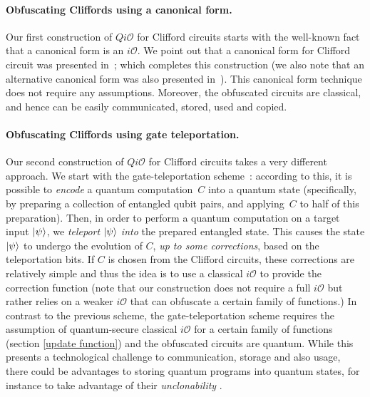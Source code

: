 \paragraph{Obfuscating Cliffords using a canonical form.} Our first construction of $Qi\mathcal{O}$ for Clifford circuits starts with the well-known fact that a canonical form is an $i\mathcal{O}$. We point out that a canonical form for Clifford circuit was presented in~\cite{AG04}; which completes this construction (we also note that an alternative canonical form was also presented in~\cite{Sel13arxiv}). This canonical form technique  does not require any assumptions. Moreover, the obfuscated circuits are classical, and hence can be easily communicated, stored, used and copied.

\paragraph{Obfuscating Cliffords using gate teleportation.} Our second construction of $Qi\mathcal{O}$ for Clifford circuits takes a very different approach. We start with the gate-teleportation scheme~\cite{GC99}: according to this, it is possible to \emph{encode} a quantum computation~$C$ into a quantum state (specifically, by preparing a collection of entangled qubit pairs, and applying~$C$ to half of this preparation). Then, in order to perform a quantum computation on a target input ${\lvert}\psi\rangle$, we \emph{teleport} ${\lvert}\psi\rangle$ \emph{into} the prepared entangled state. This causes the state ${\lvert}\psi\rangle$ to undergo the evolution of $C$, \emph{up to some corrections}, based on the teleportation bits. If $C$ is chosen from the Clifford circuits, these corrections are relatively simple and thus the idea is to use a classical  $i\mathcal{O}$ to provide the correction function (note that our construction does not require a full $i\mathcal{O}$ but rather relies on a weaker $i\mathcal{O}$ that can obfuscate a certain family of functions.)
In contrast to the previous scheme, the gate-teleportation scheme requires the assumption of quantum-secure classical $i\mathcal{O}$ for a certain family of functions (section \ref{update function}) and the obfuscated circuits are quantum. While this presents a technological challenge to communication, storage and also usage, there could be advantages to storing quantum programs into quantum states, for instance to take advantage of their \emph{unclonability} \cite{Aar09,BL19arxiv}.



